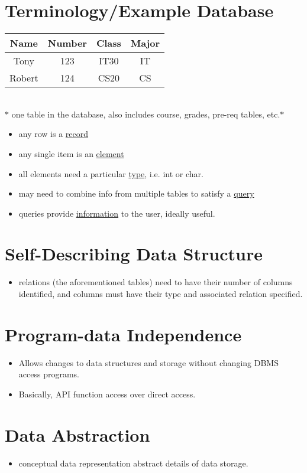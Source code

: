 \documentclass[12pt]{report}
\begin{document}
	\section{Terminology/Example Database}
	\begin{center}
		\begin{tabular}{|c|c|c|c|}
			\hline
			Name & Number & Class & Major\\
			\hline
			Tony & 123 & IT30 & IT\\
			Robert & 124 & CS20 & CS\\
			\hline
		\end{tabular}
		\\ $\ast$ one table in the database, also includes course, grades, pre-req tables, etc.$\ast$
	\end{center}
	\begin{itemize}
		\item any row is a \underline{record}
		\item any single item is an \underline{element}
		\item all elements need a particular \underline{type}, i.e. int or char.
		\item may need to combine info from multiple tables to satisfy a \underline{query}
		\item queries provide \underline{information} to the user, ideally useful.
	\end{itemize}
	\section{Self-Describing Data Structure}
	\begin{itemize}
		\item relations (the aforementioned tables) need to have their number of columns identified, and columns must have their type and associated relation specified.
	\end{itemize}
	\section{Program-data Independence}
	\begin{itemize}
		\item Allows changes to data structures and storage without changing DBMS access programs.
		\item Basically, API function access over direct access.
	\end{itemize}
	\section{Data Abstraction}
	\begin{itemize}
		\item conceptual data representation abstract details of data storage.
	\end{itemize}
\end{document}
